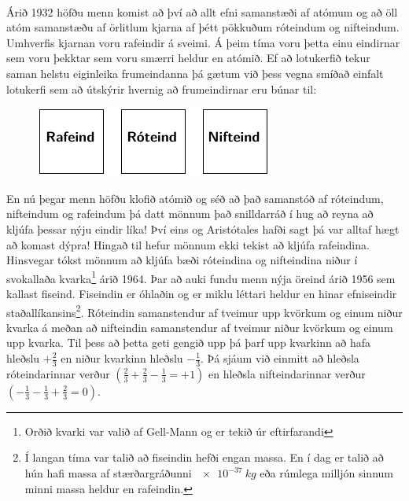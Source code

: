 \begin{tcolorbox}

 \\

\vspace{-0.3cm}
\end{tcolorbox}

Árið 1932 höfðu menn komist að því að allt efni samanstæði af atómum og að öll atóm samanstæðu af örlitlum kjarna af þétt pökkuðum róteindum og nifteindum. Umhverfis kjarnan voru rafeindir á sveimi. Á þeim tíma voru þetta einu eindirnar sem voru þekktar sem voru smærri heldur en atómið. Ef að lotukerfið tekur saman helstu eiginleika frumeindanna þá gætum við þess vegna smíðað einfalt lotukerfi sem að útskýrir hvernig að frumeindirnar eru búnar til:

\begin{figure}[H]
    \centering
    \includegraphics[width=.5\textwidth]{figures/lotukerfi3.pdf}
\end{figure}


En nú þegar menn höfðu klofið atómið og séð að það samanstóð af róteindum, nifteindum og rafeindum þá datt mönnum það snilldarráð í hug að reyna að kljúfa þessar nýju eindir líka! Því eins og Aristótales hafði sagt þá var alltaf hægt að komast dýpra! Hingað til hefur mönnum ekki tekist að kljúfa rafeindina. Hinsvegar tókst mönnum að kljúfa bæði róteindina og nifteindina niður í svokallaða kvarka\footnote{Orðið kvarki var valið af Gell-Mann og er tekið úr eftirfarandi } árið 1964. Þar að auki fundu menn nýja öreind árið 1956 sem kallast fiseind. Fiseindin er óhlaðin og er miklu léttari heldur en hinar efniseindir staðallíkansins\footnote{Í langan tíma var talið að fiseindin hefði engan massa. En í dag er talið að hún hafi massa af stærðargráðunni $\SI{e-37}{kg}$ eða rúmlega milljón sinnum minni massa heldur en rafeindin.}. Róteindin samanstendur af tveimur upp kvörkum og einum niður kvarka á meðan að nifteindin samanstendur af tveimur niður kvörkum og einum upp kvarka. Til þess að þetta geti gengið upp þá þarf upp kvarkinn að hafa hleðslu $+\frac{2}{3}$ en niður kvarkinn hleðslu $-\frac{1}{3}$. Þá sjáum við einmitt að hleðsla róteindarinnar verður $(\frac{2}{3} + \frac{2}{3} - \frac{1}{3} = +1)$ en hleðsla nifteindarinnar verður $(-\frac{1}{3} - \frac{1}{3} + \frac{2}{3} = 0)$.

